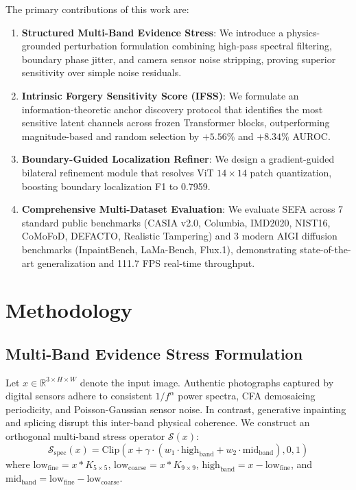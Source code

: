 \documentclass[10pt,journal,compsoc]{IEEEtran}
\begin{document}
The primary contributions of this work are:
\begin{enumerate}
    \item \textbf{Structured Multi-Band Evidence Stress}: We introduce a physics-grounded perturbation formulation combining high-pass spectral filtering, boundary phase jitter, and camera sensor noise stripping, proving superior sensitivity over simple noise residuals.
    \item \textbf{Intrinsic Forgery Sensitivity Score (IFSS)}: We formulate an information-theoretic anchor discovery protocol that identifies the most sensitive latent channels across frozen Transformer blocks, outperforming magnitude-based and random selection by $+5.56\%$ and $+8.34\%$ AUROC.
    \item \textbf{Boundary-Guided Localization Refiner}: We design a gradient-guided bilateral refinement module that resolves ViT $14\times 14$ patch quantization, boosting boundary localization F1 to 0.7959.
    \item \textbf{Comprehensive Multi-Dataset Evaluation}: We evaluate SEFA across 7 standard public benchmarks (CASIA v2.0, Columbia, IMD2020, NIST16, CoMoFoD, DEFACTO, Realistic Tampering) and 3 modern AIGI diffusion benchmarks (InpaintBench, LaMa-Bench, Flux.1), demonstrating state-of-the-art generalization and 111.7 FPS real-time throughput.
\end{enumerate}

\section{Methodology}

\subsection{Multi-Band Evidence Stress Formulation}
Let $x \in \mathbb{R}^{3 \times H \times W}$ denote the input image. Authentic photographs captured by digital sensors adhere to consistent $1/f^\alpha$ power spectra, CFA demosaicing periodicity, and Poisson-Gaussian sensor noise. In contrast, generative inpainting and splicing disrupt this inter-band physical coherence. We construct an orthogonal multi-band stress operator $\mathcal{S}(x)$:
\begin{equation}
    \mathcal{S}_{\text{spec}}(x) = \text{Clip}\left(x + \gamma \cdot (w_1 \cdot \text{high}_{\text{band}} + w_2 \cdot \text{mid}_{\text{band}}), 0, 1\right)
\end{equation}
where $\text{low}_{\text{fine}} = x * K_{5\times5}$, $\text{low}_{\text{coarse}} = x * K_{9\times9}$, $\text{high}_{\text{band}} = x - \text{low}_{\text{fine}}$, and $\text{mid}_{\text{band}} = \text{low}_{\text{fine}} - \text{low}_{\text{coarse}}$.
\end{document}
